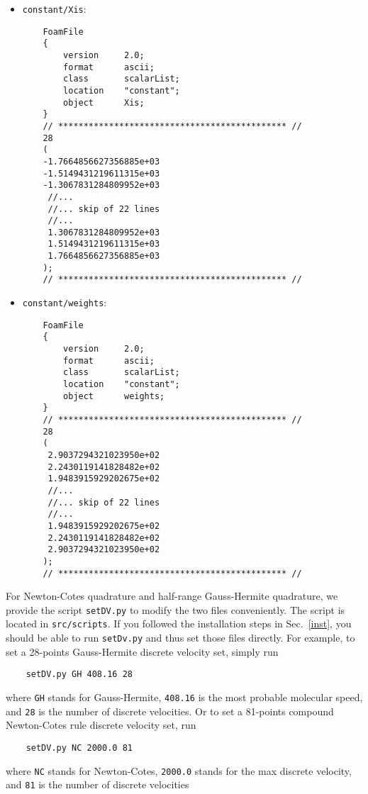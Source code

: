 \begin{itemize}
\item \verb|constant/Xis|:
\begin{verbatim}
    FoamFile
    {
        version     2.0;
        format      ascii;
        class       scalarList;
        location    "constant";
        object      Xis;
    }
    // ********************************************* //
    28
    (
    -1.7664856627356885e+03
    -1.5149431219611315e+03
    -1.3067831284809952e+03
     //...
     //... skip of 22 lines
     //...
     1.3067831284809952e+03
     1.5149431219611315e+03
     1.7664856627356885e+03
    );
    // ********************************************* //
\end{verbatim}

\item \verb|constant/weights|:
\begin{verbatim}
    FoamFile
    {
        version     2.0;
        format      ascii;
        class       scalarList;
        location    "constant";
        object      weights;
    }
    // ********************************************* //
    28
    (
     2.9037294321023950e+02
     2.2430119141828482e+02
     1.9483915929202675e+02
     //...
     //... skip of 22 lines
     //...
     1.9483915929202675e+02
     2.2430119141828482e+02
     2.9037294321023950e+02
    );
    // ********************************************* //
\end{verbatim}
\end{itemize}
For Newton-Cotes quadrature and half-range Gauss-Hermite quadrature,
we provide the script \verb|setDV.py| to modify the two files conveniently.
The script is located in \verb|src/scripts|.
If you followed the installation steps in Sec.~\ref{inst},
you should be able to run \verb|setDv.py| and thus set those files directly.
For example, to set a 28-points Gauss-Hermite discrete velocity set, simply run
\begin{verbatim}
    setDV.py GH 408.16 28
\end{verbatim}
where \verb|GH| stands for Gauss-Hermite,  \verb|408.16| is the most probable molecular speed,
and \verb|28| is the number of discrete velocities.
Or to set a 81-points compound Newton-Cotes rule discrete velocity set, run
\begin{verbatim}
    setDV.py NC 2000.0 81
\end{verbatim}
where \verb|NC| stands for Newton-Cotes, \verb|2000.0| stands for the max discrete velocity, and \verb|81| is  the number of discrete velocities
